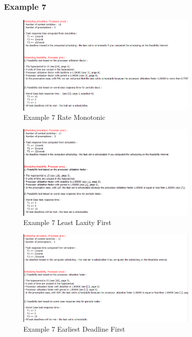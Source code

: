\documentclass{article}
\begin{document}
\subsubsection*{Example 7}
\begin{figure}[H]
    \centering
    \includegraphics[width=0.8\textwidth]{7_RM.png}
    \caption{Example 7 Rate Monotonic}
\end{figure}
\begin{figure}[H]
    \centering
    \includegraphics[width=0.8\textwidth]{7_LLF.png}
    \caption{Example 7 Least Laxity First}
\end{figure}
\begin{figure}[H]
    \centering
    \includegraphics[width=0.8\textwidth]{7_EDF.png}
    \caption{Example 7 Earliest Deadline First}
\end{figure}
\end{document}
